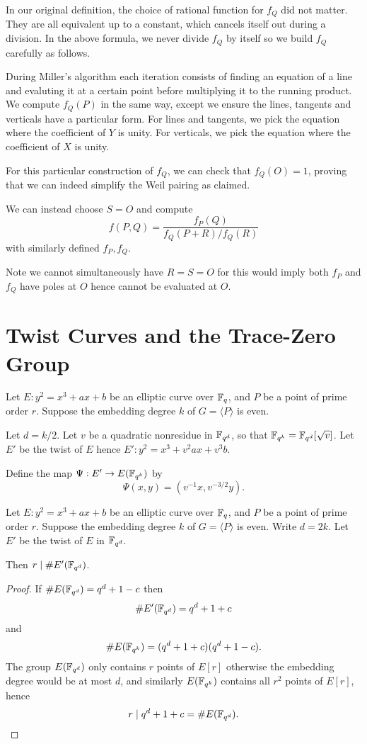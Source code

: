 In our original definition, the choice of rational function for $f_Q$
did not matter. They are all equivalent up to a constant,
which cancels itself out during a division. In the above formula,
we never divide $f_Q$ by itself so we build $f_Q$ carefully as follows.

During Miller's algorithm each iteration consists of finding an equation of
a line and evaluting it at a certain point before multiplying it to the
running product. We compute $f_Q(P)$ in the same way, except we ensure
the lines, tangents and verticals have a particular form. For lines and
tangents, we pick the equation where the coefficient of $Y$ is unity.
For verticals, we pick the equation where the coefficient of $X$ is unity.

For this particular construction of $f_Q$, we can check that $f_Q(O) = 1$,
proving that we can indeed simplify the Weil pairing as claimed.

We can instead choose $S = O$ and compute
\[ f(P,Q) = \frac{f_P(Q)}{f_Q(P+R)/f_Q(R)} \]
with similarly defined $f_P, f_Q$.

Note we cannot simultaneously have $R = S = O$ for this would imply
both $f_P$ and $f_Q$ have poles at $O$ hence cannot be evaluated at $O$.

\section {\label{sec:twistcurves}Twist Curves and the Trace-Zero Group}

Let $E : y^2 = x^3 + a x + b$ be an elliptic curve over $\mathbb{F}_q$,
and $P$ be a point of prime order $r$.
Suppose the embedding degree $k$ of $G = \langle P \rangle$ is even.

Let $d = k / 2$. Let $v$ be a quadratic nonresidue in $\mathbb{F}_{q^d}$,
so that $\mathbb{F}_{q^k} = \mathbb{F}_{q^d}[\sqrt{v}]$.
Let $E'$ be the twist of $E$ hence
$E' : y^2 = x^3 + v^2 a x + v^3 b$.

Define the map $\Psi:E'\rightarrow E(\mathbb{F}_{q^k})$ by
\[ \Psi(x,y) = (v^{-1}x, v^{-3/2}y) . \]

\begin{theorem}
Let $E : y^2 = x^3 + a x + b$ be an elliptic curve over $\mathbb{F}_q$,
and $P$ be a point of prime order $r$.
Suppose the embedding degree $k$ of $G = \langle P \rangle$ is even.
Write $d = 2k$. Let $E'$ be the twist of $E$ in $\mathbb{F}_{q^d}$.

Then $r \mid \#E'(\mathbb{F}_{q^d})$.
\end{theorem}

\begin{proof}
If $\#E(\mathbb{F}_{q^d}) = q^d + 1 - c$ then
\[ \#E'(\mathbb{F}_{q^d}) = q^d + 1 + c \]
and
\[ \#E(\mathbb{F}_{q^k}) = (q^{d} + 1 + c)(q^{d} + 1 - c) . \]
The group $E(\mathbb{F}_{q^d})$ only contains $r$ points of $E[r]$ otherwise
the embedding degree would be at most $d$, and similarly
$E(\mathbb{F}_{q^k})$ contains all $r^2$ points of $E[r]$,
hence
\[ r \mid q^{d} + 1 + c = \#E(\mathbb{F}_{q^d}) .\]
\end{proof}

